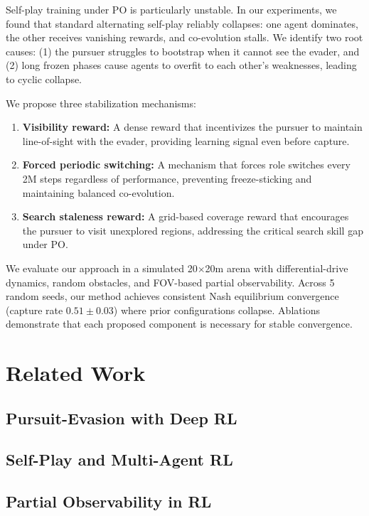 \documentclass[letterpaper, 10 pt, conference]{ieeeconf}
\begin{document}
Self-play training under PO is particularly unstable. In our experiments, we found that
standard alternating self-play reliably collapses: one agent dominates, the other receives
vanishing rewards, and co-evolution stalls. We identify two root causes: (1) the pursuer
struggles to bootstrap when it cannot see the evader, and (2) long frozen phases cause
agents to overfit to each other's weaknesses, leading to cyclic collapse.

We propose three stabilization mechanisms:
\begin{enumerate}
    \item \textbf{Visibility reward:} A dense reward that incentivizes the pursuer to maintain
    line-of-sight with the evader, providing learning signal even before capture.
    \item \textbf{Forced periodic switching:} A mechanism that forces role switches every
    2M steps regardless of performance, preventing freeze-sticking and maintaining
    balanced co-evolution.
    \item \textbf{Search staleness reward:} A grid-based coverage reward that encourages
    the pursuer to visit unexplored regions, addressing the critical search skill gap
    under PO.
\end{enumerate}

We evaluate our approach in a simulated 20$\times$20m arena with differential-drive dynamics,
random obstacles, and FOV-based partial observability. Across 5 random seeds, our method
achieves consistent Nash equilibrium convergence (capture rate $0.51 \pm 0.03$) where
prior configurations collapse. Ablations demonstrate that each proposed component is
necessary for stable convergence.

\section{Related Work}
\label{sec:related_work}

\subsection{Pursuit-Evasion with Deep RL}

\subsection{Self-Play and Multi-Agent RL}

\subsection{Partial Observability in RL}
\end{document}
